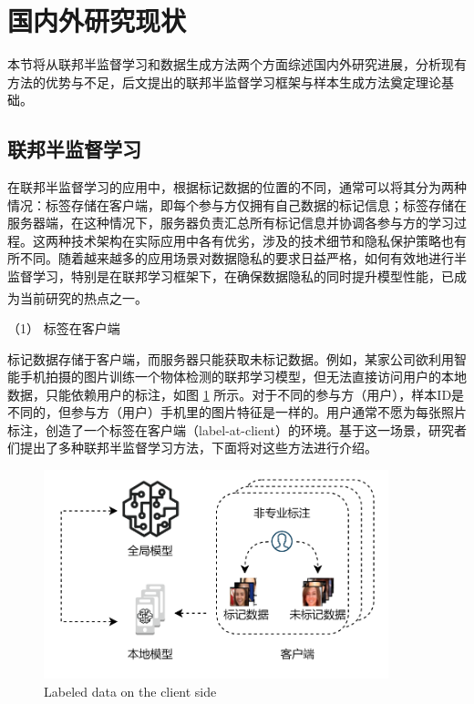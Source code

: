 


\section{国内外研究现状}
本节将从联邦半监督学习和数据生成方法两个方面综述国内外研究进展，分析现有方法的优势与不足，后文提出的联邦半监督学习框架与样本生成方法奠定理论基础。
\subsection{联邦半监督学习}
在联邦半监督学习的应用中，根据标记数据的位置的不同，通常可以将其分为两种情况：标签存储在客户端，即每个参与方仅拥有自己数据的标记信息；标签存储在服务器端，在这种情况下，服务器负责汇总所有标记信息并协调各参与方的学习过程。这两种技术架构在实际应用中各有优劣，涉及的技术细节和隐私保护策略也有所不同。随着越来越多的应用场景对数据隐私的要求日益严格，如何有效地进行半监督学习，特别是在联邦学习框架下，在确保数据隐私的同时提升模型性能，已成为当前研究的热点之一\textsuperscript{\cite{jin2023federated}}。

（1） 标签在客户端

标记数据存储于客户端，而服务器只能获取未标记数据。例如，某家公司欲利用智能手机拍摄的图片训练一个物体检测的联邦学习模型，但无法直接访问用户的本地数据，只能依赖用户的标注，如图 \ref{LabelAtClient} 所示。对于不同的参与方（用户），样本ID是不同的，但参与方（用户）手机里的图片特征是一样的。用户通常不愿为每张照片标注，创造了一个标签在客户端（label-at-client）的环境。基于这一场景，研究者们提出了多种联邦半监督学习方法，下面将对这些方法进行介绍。

\vspace{-0.1cm}
\begin{figure}[h]
	\centering
	\includegraphics[width=10cm]{chapters/imgs/LabelAtClient}
	{\wuhao Labeled data on the client side}
	\label{LabelAtClient}
\end{figure}
\vspace{-0.35cm}

